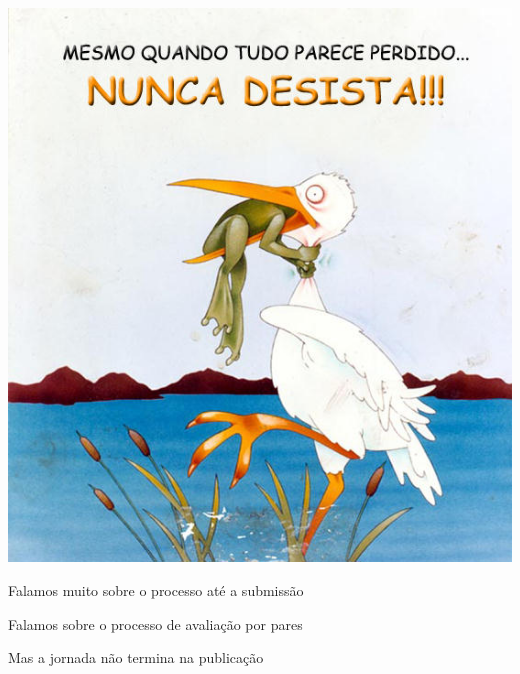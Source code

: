 \documentclass{beamer}
\begin{document}
\begin{frame}
  \begin{center}
    \includegraphics[height=.75\textheight]{Encerramento/naodesista3}

    \vfill
  \end{center}
\end{frame}

\begin{frame}
  \begin{center}
    Falamos muito sobre o processo até a submissão

  \end{center}
\end{frame}

\begin{frame}
  \begin{center}
    Falamos sobre o processo de avaliação por pares

  \end{center}
\end{frame}

\begin{frame}
  \begin{center}
    Mas a jornada não termina na publicação

    \vfill
  \end{center}
\end{frame}
\end{document}
